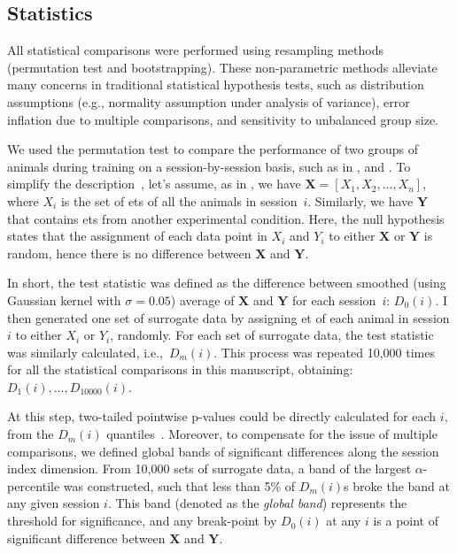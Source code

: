 \subsection{Statistics}
All statistical comparisons were performed using resampling methods (permutation test and bootstrapping).
These non-parametric methods alleviate many concerns in traditional statistical hypothesis tests, such as distribution assumptions (e.g., normality assumption under analysis of variance), error inflation due to multiple comparisons, and sensitivity to unbalanced group size.
\par
We used the permutation test to compare the performance of two groups of animals during training on a session-by-session basis, such as in , and .
To simplify the description~\cite[see][for the complete description]{Fujisawa2008NN}, let's assume, as in , we have ${\mathbf{X}=[X_1, X_2,...,X_n]}$, where $X_i$ is the set of \glspl{et} of all the animals in session~$i$.
Similarly, we have $\mathbf{Y}$ that contains \glspl{et} from another experimental condition.
Here, the null hypothesis states that the assignment of each data point in $X_i$ and $Y_i$ to either $\mathbf{X}$ or $\mathbf{Y}$ is random, hence there is no difference between $\mathbf{X}$ and $\mathbf{Y}$.
\par
In short, the test statistic was defined as the difference between smoothed (using Gaussian kernel with $\sigma =0.05$) average of $\mathbf{X}$ and $\mathbf{Y}$ for each session~$i$: $D_0(i)$.
I then generated one set of surrogate data by assigning \gls{et} of each animal in session $i$ to either $X_i$ or $Y_i$, randomly.
For each set of surrogate data, the test statistic was similarly calculated, i.e.,~$D_m(i)$.
This process was repeated 10,000 times for all the statistical comparisons in this manuscript, obtaining: $D_1(i),\ldots,D_{10000}(i)$.
\par
At this step, two-tailed pointwise p-values could be directly calculated for each $i$, from the $D_m(i)$ quantiles~\cite{Fujisawa2008NN}.
Moreover, to compensate for the issue of multiple comparisons, we defined global bands of significant differences along the session index dimension.
From 10,000 sets of surrogate data, a band of the largest $\alpha$-percentile was constructed, such that less than 5\% of $D_m(i)$s broke the band at any given session $i$.
This band (denoted as the \textit{global band}) represents the threshold for significance, and any break-point by $D_0(i)$ at any $i$ is a point of significant difference between $\mathbf{X}$ and $\mathbf{Y}$.
